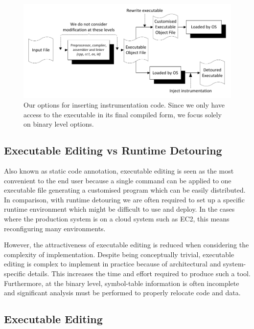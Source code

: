 \begin{figure}[H]
 \centering
 \includegraphics{Detouring_Options.pdf}
 \caption[Detouring Options]{Our options for inserting instrumentation code. Since we only have access to the executable in its final compiled form, we focus solely on binary level options.}
\end{figure}

\subsection{Executable Editing vs Runtime Detouring}

Also known as static code annotation\cite{static_code_annotation}, executable editing is seen as the most convenient to the end user because a single command can be applied to one executable file generating a customised program which can be easily distributed. In comparison, with runtime detouring we are often required to set up a specific runtime environment which might be difficult to use and deploy. In the cases where the production system is on a cloud system such as EC2, this means reconfiguring many environments.

However, the attractiveness of executable editing is reduced when considering the complexity of implementation. Despite being conceptually trivial, executable editing is complex to implement in practice because of architectural and system-specific details. This increases the time and effort required to produce such a tool. Furthermore, at the binary level, symbol-table information is often incomplete and significant analysis must be performed to properly relocate code and data\cite{rewriting_executable_files}.

\subsection{Executable Editing}

